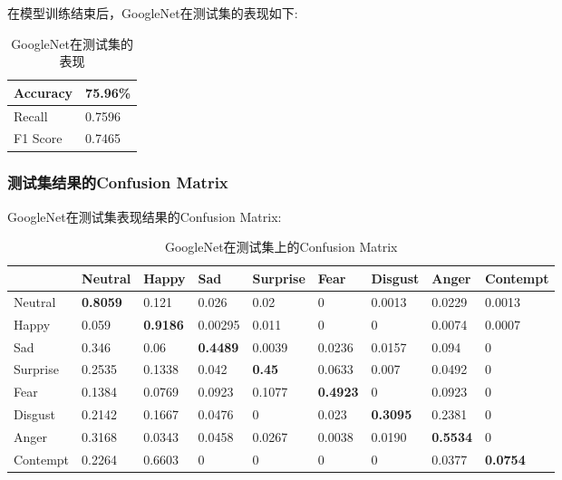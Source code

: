 \documentclass[11pt, a4paper]{article}
\begin{document}
\begin{CJK}{UTF8}{gbsn}
在模型训练结束后，GoogleNet在测试集的表现如下:

\begin{table}[htbp] 
	\begin{center}
		\caption{GoogleNet在测试集的表现}
		\begin{tabular}{l | l}  \hline
  	    Accuracy  &  75.96\%  \\ \hline
  	    Recall        &  0.7596 \\ \hline
  	    F1 Score    & 0.7465 \\ \hline
		\end{tabular}
		\label{tab:gooNet_test}
	\end{center}
\end{table}	

\subsubsection{测试集结果的Confusion Matrix}

GoogleNet在测试集表现结果的Confusion Matrix:

\begin{table}[htbp] 
	\begin{center}
		\caption{GoogleNet在测试集上的Confusion Matrix}
		\begin{tabular}{ | l | l | l | l | l |l | l |l | l | }  \hline
		&  Neutral  & Happy & Sad   &  Surprise   &  Fear  & Disgust  & Anger & Contempt  \\ \hline
	 Neutral  & \textbf{0.8059}   & 0.121  & 0.026  & 0.02  & 0 & 0.0013 &  0.0229 & 0.0013 \\ \hline
	 Happy   & 0.059  & \textbf{0.9186}  & 0.00295   & 0.011  & 0   & 0  & 0.0074  &  0.0007 \\ \hline
	 Sad    & 0.346  & 0.06  & \textbf{0.4489}   & 0.0039  & 0.0236   & 0.0157  & 0.094  & 	0  \\ \hline
	 Surprise    & 0.2535   & 0.1338  & 0.042   & \textbf{0.45}   & 0.0633   &  0.007  & 0.0492 &  0\\ \hline
	  Fear     & 0.1384  & 0.0769 & 0.0923  & 0.1077  & \textbf{0.4923}   & 0  & 0.0923 & 0 \\ \hline
	  Disgust      &  0.2142  & 0.1667  & 0.0476    & 0   & 0.023   & \textbf{0.3095}  &  0.2381 & 0 \\ \hline
	  Anger       & 0.3168   & 0.0343  & 0.0458   & 0.0267  & 0.0038   & 0.0190  & \textbf{0.5534} &  0 \\ \hline
	  Contempt   & 0.2264  & 0.6603  &  0  & 0 & 0  & 0 &  0.0377 & \textbf{0.0754} \\ \hline
		\end{tabular}
		\label{tab:gooNet_cm}
	\end{center}
\end{table}	


\end{CJK}
\end{document}
